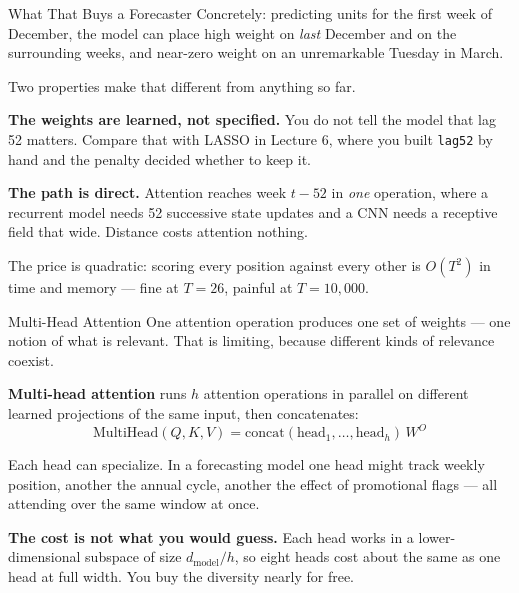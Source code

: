 \documentclass[aspectratio=169, 11pt]{beamer}
\begin{document}
\begin{frame}{What That Buys a Forecaster}
  Concretely: predicting units for the first week of December, the model can place high weight on
  \emph{last} December and on the surrounding weeks, and near-zero weight on an unremarkable
  Tuesday in March.

  \vspace{0.15cm}
  Two properties make that different from anything so far.

  \vspace{0.1cm}
  \textbf{The weights are learned, not specified.} You do not tell the model that lag 52 matters.
  Compare that with LASSO in Lecture 6, where you built \texttt{lag52} by hand and the penalty
  decided whether to keep it.

  \vspace{0.1cm}
  \textbf{The path is direct.} Attention reaches week $t-52$ in \emph{one} operation, where a
  recurrent model needs 52 successive state updates and a CNN needs a receptive field that wide.
  Distance costs attention nothing.

  \begin{warningbox}
    The price is quadratic: scoring every position against every other is $O(T^2)$ in time and
    memory --- fine at $T = 26$, painful at $T = 10{,}000$.
  \end{warningbox}
\end{frame}

\begin{frame}{Multi-Head Attention}
  One attention operation produces one set of weights --- one notion of what is relevant. That is
  limiting, because different kinds of relevance coexist.

  \vspace{0.15cm}
  \textbf{Multi-head attention} runs $h$ attention operations in parallel on different learned
  projections of the same input, then concatenates:
  \[
    \text{MultiHead}(Q,K,V) = \text{concat}(\text{head}_1, \ldots, \text{head}_h)\, W^O
  \]
  \vspace{-0.3cm}

  Each head can specialize. In a forecasting model one head might track weekly position, another
  the annual cycle, another the effect of promotional flags --- all attending over the same
  window at once.

  \vspace{0.15cm}
  \textbf{The cost is not what you would guess.} Each head works in a lower-dimensional subspace
  of size $d_{\text{model}}/h$, so eight heads cost about the same as one head at full width.
  You buy the diversity nearly for free.

  \vspace{0.1cm}
\end{frame}
\end{document}
